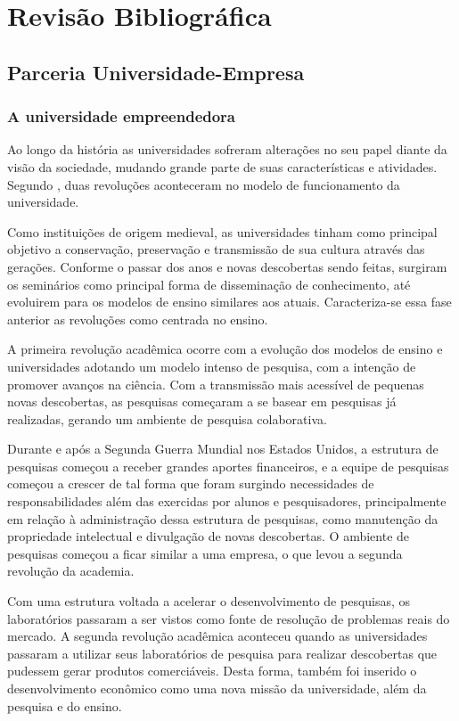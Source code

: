 \chapter[Revisão Bibliográfica]{Revisão Bibliográfica}
\label{chap:revisao}
\section{Parceria Universidade-Empresa}
\label{cha:ensino}
\subsection{A universidade empreendedora}
\label{cha:univ_empreend}

Ao longo da história as universidades sofreram alterações no seu papel diante da visão da sociedade, mudando grande parte de suas características e atividades. Segundo , duas revoluções aconteceram no modelo de funcionamento da universidade.

Como instituições de origem medieval, as universidades tinham como principal objetivo a conservação, preservação e transmissão de sua cultura através das gerações. Conforme o passar dos anos e novas descobertas sendo feitas, surgiram os seminários como principal forma de disseminação de conhecimento, até evoluirem para os modelos de ensino similares aos atuais. Caracteriza-se essa fase anterior as revoluções como centrada no ensino.

A primeira revolução acadêmica ocorre com a evolução dos modelos de ensino e universidades adotando um modelo intenso de pesquisa, com a intenção de promover avanços na ciência. Com a transmissão mais acessível de pequenas novas descobertas, as pesquisas começaram a se basear em pesquisas já realizadas, gerando um ambiente de pesquisa colaborativa. 

Durante e após a Segunda Guerra Mundial nos Estados Unidos, a estrutura de pesquisas começou a receber grandes aportes financeiros, e a equipe de pesquisas começou a crescer de tal forma que foram surgindo necessidades de responsabilidades além das exercidas por alunos e pesquisadores, principalmente em relação à administração dessa estrutura de pesquisas, como manutenção da propriedade intelectual e divulgação de novas descobertas. O ambiente de pesquisas começou a ficar similar a uma empresa, o que levou a segunda revolução da academia.

Com uma estrutura voltada a acelerar o desenvolvimento de pesquisas, os laboratórios passaram a ser vistos como fonte de resolução de problemas reais do mercado. A segunda revolução acadêmica aconteceu quando as universidades passaram a utilizar seus laboratórios de pesquisa para realizar descobertas que pudessem gerar produtos comerciáveis. Desta forma, também foi inserido o desenvolvimento econômico como uma nova missão da universidade, além da pesquisa e do ensino.

